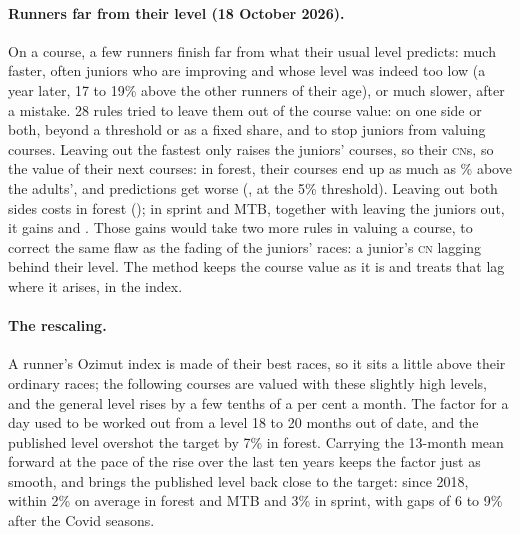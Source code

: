 \documentclass[11pt,a4paper]{article}
\newcommand{\CN}{\textsc{cn}}
\begin{document}
\paragraph{Runners far from their level (18 October 2026).} On a course, a few runners finish far from what their usual level predicts: much faster, often juniors who are improving and whose level was indeed too low (a year later, 17 to 19\% above the other runners of their age), or much slower, after a mistake. 28 rules tried to leave them out of the course value: on one side or both, beyond a threshold or as a fixed share, and to stop juniors from valuing courses. Leaving out the fastest only raises the juniors' courses, so their \CN s, so the value of their next courses: in forest, their courses end up as much as \NoutLoop\% above the adults', and predictions get worse (\NoutFast, \NoutFastFive{} at the 5\% threshold). Leaving out both sides costs in forest (\NoutBothF); in sprint and MTB, together with leaving the juniors out, it gains \NoutXS{} and \NoutXV. Those gains would take two more rules in valuing a course, to correct the same flaw as the fading of the juniors' races: a junior's \CN{} lagging behind their level. The method keeps the course value as it is and treats that lag where it arises, in the index.

\paragraph{The rescaling.} A runner's Ozimut index is made of their best races, so it sits a little above their ordinary races; the following courses are valued with these slightly high levels, and the general level rises by a few tenths of a per cent a month. The factor for a day used to be worked out from a level 18 to 20 months out of date, and the published level overshot the target by 7\% in forest. Carrying the 13-month mean forward at the pace of the rise over the last ten years keeps the factor just as smooth, and brings the published level back close to the target: since 2018, within 2\% on average in forest and MTB and 3\% in sprint, with gaps of 6 to 9\% after the Covid seasons.
\end{document}
